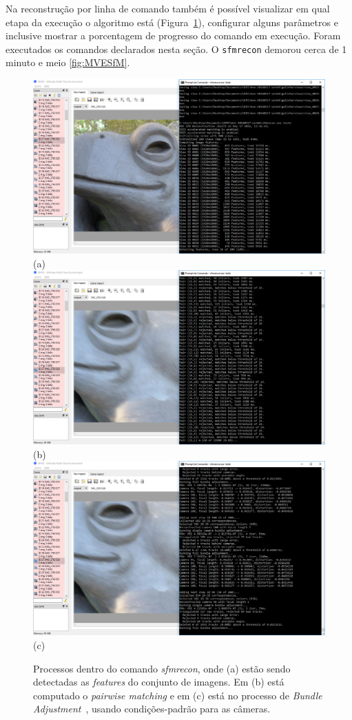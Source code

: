 Na reconstrução por linha de comando também é possível visualizar em qual etapa
da execução o algoritmo está (Figura~\ref{fig:passosMVE}), configurar alguns
parâmetros e inclusive mostrar a porcentagem de progresso do comando em
execução. Foram executados os comandos declarados nesta seção.  O
\texttt{sfmrecon} demorou cerca de 1 minuto e meio \ref{fig:MVESfM}. 

\begin{figure}[!h]
	\centering
	\includegraphics[width=0.45\linewidth]{figs/umve2sfm.png} (a)
	\includegraphics[width=0.45\linewidth]{figs/umve3sfmfeature.png} (b)
	\includegraphics[width=0.45\linewidth]{figs/umve4ba.png} (c)
	\caption{%
  Processos dentro do comando \emph{sfmrecon}, onde (a) estão sendo detectadas
  as \emph{features} do conjunto de imagens. Em (b) está computado o
  \emph{pairwise matching} e em (c) está no processo de \emph{Bundle
  Adjustment}~\cite{bundleAdjustmentSlide}, usando condições-padrão para as
  câmeras.
  }\label{fig:passosMVE}
\end{figure} 



